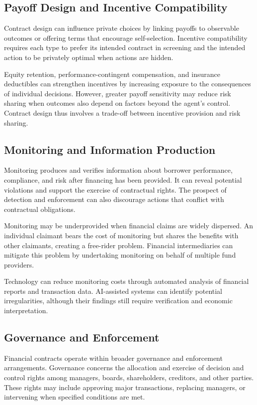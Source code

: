 \subsection{Payoff Design and Incentive Compatibility}

Contract design can influence private choices by linking payoffs to observable outcomes or offering terms that encourage self-selection. Incentive compatibility requires each type to prefer its intended contract in screening and the intended action to be privately optimal when actions are hidden.

Equity retention, performance-contingent compensation, and insurance deductibles can strengthen incentives by increasing exposure to the consequences of individual decisions. However, greater payoff sensitivity may reduce risk sharing when outcomes also depend on factors beyond the agent's control. Contract design thus involves a trade-off between incentive provision and risk sharing.

\subsection{Monitoring and Information Production}

Monitoring produces and verifies information about borrower performance, compliance, and risk after financing has been provided. It can reveal potential violations and support the exercise of contractual rights. The prospect of detection and enforcement can also discourage actions that conflict with contractual obligations.

Monitoring may be underprovided when financial claims are widely dispersed. An individual claimant bears the cost of monitoring but shares the benefits with other claimants, creating a free-rider problem. Financial intermediaries can mitigate this problem by undertaking monitoring on behalf of multiple fund providers.

Technology can reduce monitoring costs through automated analysis of financial reports and transaction data. AI-assisted systems can identify potential irregularities, although their findings still require verification and economic interpretation.

\subsection{Governance and Enforcement}

Financial contracts operate within broader governance and enforcement arrangements. Governance concerns the allocation and exercise of decision and control rights among managers, boards, shareholders, creditors, and other parties. These rights may include approving major transactions, replacing managers, or intervening when specified conditions are met.

